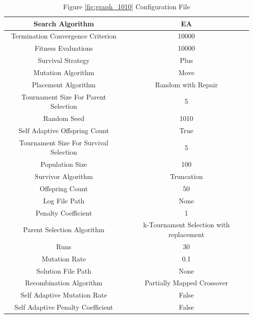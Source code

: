 \documentclass{standalone}
\begin{document}
\begin{table}[!htb]
	\centering
	\caption{Figure \ref{fig:graph_1010} Configuration File}
	\label{tab:graph_1010}
	\begin{tabular}{| c | c |}
		\hline
		Search Algorithm		& EA		 \\
		\hline
		Termination Convergence Criterion		& 10000		 \\
		\hline
		Fitness Evaluations		& 10000		 \\
		\hline
		Survival Strategy		& Plus		 \\
		\hline
		Mutation Algorithm		& Move		 \\
		\hline
		Placement Algorithm		& Random with Repair		 \\
		\hline
		Tournament Size For Parent Selection		& 5		 \\
		\hline
		Random Seed		& 1010		 \\
		\hline
		Self Adaptive Offspring Count		& True		 \\
		\hline
		Tournament Size For Survival Selection		& 5		 \\
		\hline
		Population Size		& 100		 \\
		\hline
		Survivor Algorithm		& Truncation		 \\
		\hline
		Offspring Count		& 50		 \\
		\hline
		Log File Path		& None		 \\
		\hline
		Penalty Coefficient		& 1		 \\
		\hline
		Parent Selection Algorithm		& k-Tournament Selection with replacement		 \\
		\hline
		Runs		& 30		 \\
		\hline
		Mutation Rate		& 0.1		 \\
		\hline
		Solution File Path		& None		 \\
		\hline
		Recombination Algorithm		& Partially Mapped Crossover		 \\
		\hline
		Self Adaptive Mutation Rate		& False		 \\
		\hline
		Self Adaptive Penalty Coefficient		& False		 \\
		\hline
	\end{tabular}
\end{table}
\end{document}
